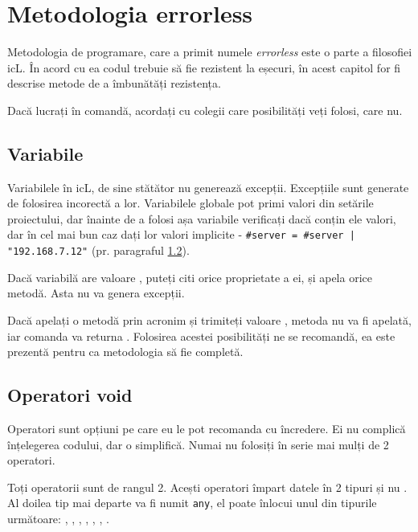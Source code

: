 
\section{Metodologia errorless}

\label{errorless-sec}

Metodologia de programare, care a primit numele \textit{errorless} este o parte a filosofiei icL. În acord cu ea codul trebuie să fie rezistent la eșecuri, în acest capitol for fi descrise metode de a îmbunătăți rezistența.

Dacă lucrați în comandă, acordați cu colegii care posibilități veți folosi, care nu.

\subsection{Variabile}

Variabilele în icL, de sine stătător nu generează excepții. Excepțiile sunt generate de folosirea incorectă a lor. Variabilele globale pot primi valori din setările proiectului, dar înainte de a folosi așa variabile verificați dacă conțin ele valori, dar în cel mai bun caz dați lor valori implicite - \texttt{#server = #server | "192.168.7.12"} (pr. paragraful \ref{void-operators}).

Dacă variabilă are valoare \void, puteți citi orice proprietate a ei, și apela orice metodă. Asta nu va genera excepții.

Dacă apelați o metodă prin acronim și trimiteți valoare \void, metoda nu va fi apelată, iar comanda va returna \void. Folosirea acestei posibilități ne se recomandă, ea este prezentă pentru ca metodologia să fie completă.

\subsection{Operatori {\color{lightblue}void}}

\label{void-operators}

Operatori \void{} sunt opțiuni pe care eu le pot recomanda cu încredere. Ei nu complică înțelegerea codului, dar o simplifică. Numai nu folosiți în serie mai mulți de 2 operatori.

Toți operatorii \void{} sunt de rangul 2. Acești operatori împart datele în 2 tipuri \void{} și nu \void{}. Al doilea tip mai departe va fi numit \texttt{any}, el poate înlocui unul din tipurile următoare: \integer{}, \double{}, \str{}, \listtype{}, \object{}, \set{}, \element{}.

